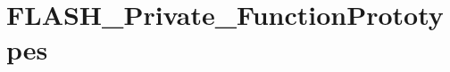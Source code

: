 \hypertarget{group___f_l_a_s_h___private___function_prototypes}{}\section{F\+L\+A\+S\+H\+\_\+\+Private\+\_\+\+Function\+Prototypes}
\label{group___f_l_a_s_h___private___function_prototypes}
